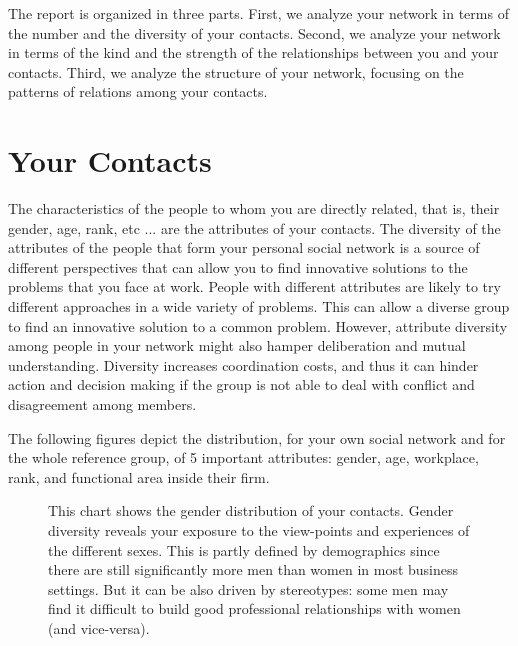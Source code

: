 \documentclass[a4paper,12pt]{article}
\begin{document}
The report is organized in three parts. First, we analyze your network in terms of the number and the diversity of your contacts. Second, we analyze your network in terms of the kind and the strength of the relationships between you and your contacts. Third, we analyze the structure of your network, focusing on the patterns of relations among your contacts.


\newpage


\section*{Your Contacts}


The characteristics of the people to whom you are directly related, that is, their gender, age, rank, etc ... are the attributes of your contacts. The diversity of the attributes of the people that form your personal social network is a source of different perspectives that can allow you to find innovative solutions to the problems that you face at work. People with different attributes are likely to try different approaches in a wide variety of problems. This can allow a diverse group to find an innovative solution to a common problem. However, attribute diversity among people in your network might also hamper deliberation and mutual understanding. Diversity increases coordination costs, and thus it can hinder action and decision making if the group is not able to deal with conflict and disagreement among members.

The following figures depict the distribution, for your own social network and for the whole reference group, of 5 important attributes: gender, age, workplace, rank, and functional area inside their firm.


\begin{figure}[H]
\centering
{}
\hspace{.01in}
\caption{This chart shows the gender distribution of your contacts. Gender diversity reveals your exposure to the view-points and experiences of the different sexes. This is partly defined by demographics since there are still significantly more men than women in most business settings. But it can be also driven by stereotypes: some men may find it difficult to build good professional relationships with women (and vice-versa).}
\end{figure}
\end{document}
